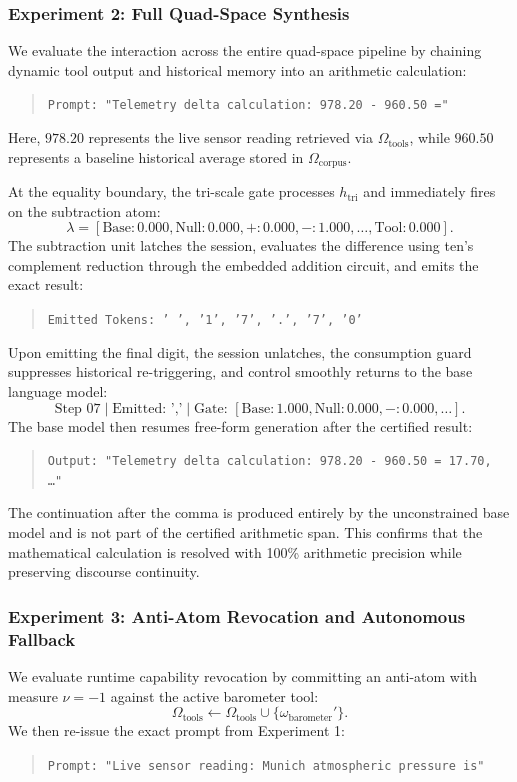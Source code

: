 \documentclass[preprint,12pt]{elsarticle}
\begin{document}
\subsubsection{Experiment 2: Full Quad-Space Synthesis}
We evaluate the interaction across the entire quad-space pipeline by chaining dynamic tool output and historical memory into an arithmetic calculation:
\begin{quote}
\texttt{Prompt: "Telemetry delta calculation: 978.20 - 960.50 ="}
\end{quote}
Here, $978.20$ represents the live sensor reading retrieved via $\Omega_{\mathrm{tools}}$, while $960.50$ represents a baseline historical average stored in $\Omega_{\mathrm{corpus}}$.

At the equality boundary, the tri-scale gate processes $h_{\mathrm{tri}}$ and immediately fires on the subtraction atom:
\begin{equation}
\lambda = [\text{Base}: 0.000, \text{Null}: 0.000, +: 0.000, -: 1.000, \dots, \text{Tool}: 0.000].
\end{equation}
The subtraction unit latches the session, evaluates the difference using ten's complement reduction through the embedded addition circuit, and emits the exact result:
\begin{quote}
\texttt{Emitted Tokens: ' ', '1', '7', '.', '7', '0'}
\end{quote}
Upon emitting the final digit, the session unlatches, the consumption guard suppresses historical re-triggering, and control smoothly returns to the base language model:
\begin{equation}
\text{Step 07} \mid \text{Emitted: } \texttt{','} \mid \text{Gate: } [\text{Base}: 1.000, \text{Null}: 0.000, -: 0.000, \dots].
\end{equation}
The base model then resumes free-form generation after the certified result:
\begin{quote}
\texttt{Output: "Telemetry delta calculation: 978.20 - 960.50 = 17.70, \dots"}
\end{quote}
The continuation after the comma is produced entirely by the unconstrained base model and is not part of the certified arithmetic span.
This confirms that the mathematical calculation is resolved with 100\% arithmetic precision while preserving discourse continuity.

\subsubsection{Experiment 3: Anti-Atom Revocation and Autonomous Fallback}
We evaluate runtime capability revocation by committing an anti-atom with measure $\nu = -1$ against the active barometer tool:
\begin{equation}
\Omega_{\mathrm{tools}} \leftarrow \Omega_{\mathrm{tools}} \cup \{\omega_{\mathrm{barometer}}'\}.
\end{equation}
We then re-issue the exact prompt from Experiment 1:
\begin{quote}
\texttt{Prompt: "Live sensor reading: Munich atmospheric pressure is"}
\end{quote}
\end{document}
